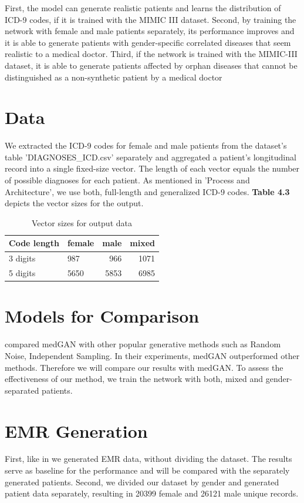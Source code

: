 \documentclass[11pt, a4paper, oneside]{book}
\begin{document}
First, the model can generate realistic patients and learns the distribution of ICD-9 codes, if it is trained with the MIMIC III dataset.
Second, by training the network with female and male patients separately, its performance improves and it is able to generate patients with gender-specific correlated diseases that seem realistic to a medical doctor.
Third, if the network is trained with the MIMIC-III dataset, it is able to generate patients affected by orphan diseases that cannot be distinguished as a non-synthetic patient by a medical doctor

\section{Data}
We extracted the ICD-9 codes for female and male patients from the dataset's table 'DIAGNOSES\_ICD.csv' separately and aggregated a patient’s longitudinal record into a single fixed-size vector. The length of each vector equals the number of possible diagnoses for each patient. As mentioned in 'Process and Architecture', we use both, full-length and generalized ICD-9 codes. \textbf{Table 4.3} depicts the vector sizes for the output.


\begin{table}
\begin{tabularx}{\textwidth}{X|l|r|r}
Code length & female & male & mixed\\
\hline
3 digits  & 987 & 966 & 1071\\
5 digits & 5650 & 5853 & 6985\\
\end{tabularx}
\caption{Vector sizes for output data}
\end{table}


\section{Models for Comparison}
\citep{Choi2017} compared medGAN with other popular generative methods such as Random Noise, Independent Sampling. In their experiments, medGAN outperformed other methods. Therefore we will compare our results with medGAN. To assess the effectiveness of our method, we train the network with both, mixed and gender-separated patients. 

\section{EMR Generation}
First, like in \citep{Choi2017} we generated EMR data, without dividing the dataset. The results serve as baseline for the performance and will be compared with the separately generated patients.
Second, we divided our dataset by gender and generated patient data separately, resulting in 20399 female and 26121 male unique records.
\\
\end{document}

